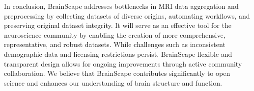 In conclusion, BrainScape addresses bottlenecks in MRI data aggregation and preprocessing by 
collecting datasets of diverse origins, automating workflows, and preserving original dataset integrity. 
It will serve as an effective tool for the neuroscience community by enabling the creation of more comprehensive, representative, and robust datasets.
While challenges such as inconsistent demographic data and licensing restrictions persist, 
BrainScape flexible and transparent design allows for ongoing improvements through active community collaboration.
We believe that BrainScape contributes significantly to open science and enhances our understanding of brain structure and function.